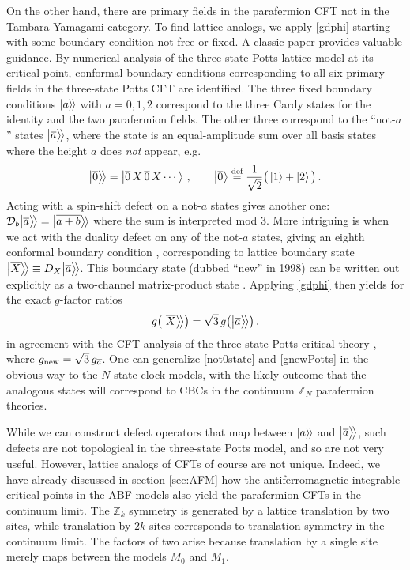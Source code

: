 On the other hand, there are primary fields in the parafermion CFT not in the Tambara-Yamagami category. To find lattice analogs, we apply \eqref{gdphi} starting with some boundary condition not free or fixed. 
A classic paper \cite{Saleur1989} provides valuable guidance. By numerical analysis of the three-state Potts lattice model at its critical point, conformal boundary conditions corresponding to all six primary fields in the three-state Potts CFT are identified. The three fixed boundary conditions ${|{a}\rangle\mkern-2mu\rangle}$ with $a=0,1,2$ correspond to the three Cardy states for the identity and the two parafermion fields. The other three correspond to the ``not-$a$'' states ${\big|{\overline{a}}\big\rangle\!\big\rangle}$, where the state is an equal-amplitude sum over all basis states where the height $a$ does {\em not} appear, e.g.
\begin{align}
{\big|{\overline{0}}\big\rangle\!\big\rangle} = \Ket{\overline{0}\,X\,\overline{0}\,X\cdots} \,,\qquad    \Ket{\overline{0}} \mathrel{\overset{\textrm{def}}{=}} \frac{1}{\sqrt{2}}\big( \ket{1}+\ket{2}\big)\,.
\label{not0state}
\end{align}
Acting with a spin-shift defect on a not-$a$ states gives another one: $\mathcal{D}_b{\big|{\overline{a}}\big\rangle\!\big\rangle} = {\big|{\overline{a+b}}\big\rangle\!\big\rangle}$ where the sum is interpreted mod $3$. More intriguing is when we act with the duality defect on any of the not-$a$ states, giving an eighth conformal boundary condition \cite{Affleck1998}, corresponding to lattice boundary state ${\big|{\overline{X}}\big\rangle\!\big\rangle} \equiv D_X {\big|{\overline{a}}\big\rangle\!\big\rangle}$.
This boundary state (dubbed ``new'' in 1998) can be written out explicitly as a two-channel matrix-product state \cite{OBrien2019}. Applying \eqref{gdphi} then yields for the exact $g$-factor ratios
\begin{align}
	g\big({\big|{\overline{X}}\big\rangle\!\big\rangle}\big)=\sqrt{3}\, g\big({\big|{\overline{a}}\big\rangle\!\big\rangle}\big) \,.
\label{gnewPotts}
\end{align}
in agreement with the CFT analysis of the three-state Potts critical theory \cite{Saleur1989,Affleck1998}, where $g_{\rm new}=\sqrt{3}\,g_{\overline{a}}$. One can generalize \eqref{not0state} and \eqref{gnewPotts} in the obvious way to the $N$-state clock models, with the likely outcome that the analogous states will correspond to CBCs in the continuum $\mathbb{Z}_N$ parafermion theories.

While we can construct defect operators that map between ${|{a}\rangle\mkern-2mu\rangle}$ and ${\big|{\overline{a}}\big\rangle\!\big\rangle}$, such defects are not topological in the three-state Potts model, and so are not very useful. However,  lattice analogs of CFTs of course are not unique. Indeed, we have already discussed in section \ref{sec:AFM} how the antiferromagnetic integrable critical points in the ABF models also yield the parafermion CFTs in the continuum limit. The $\mathbb{Z}_k$ symmetry is generated by a lattice translation by two sites, while translation by $2k$ sites corresponds to translation symmetry in the continuum limit. The factors of two arise because translation by a single site merely maps between the models $M_0$ and ${M}_1$. 

